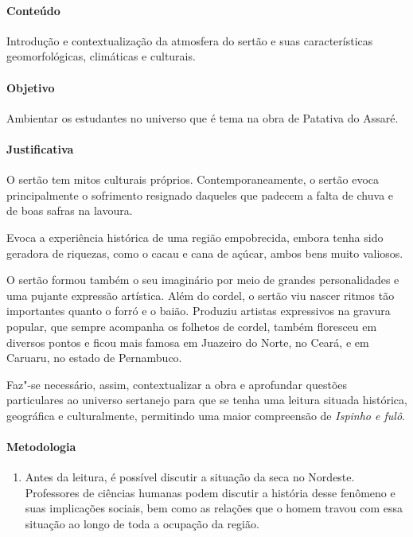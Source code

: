 \documentclass[12pt]{extarticle}
\begin{document}
{\paragraph{Conteúdo} Introdução e contextualização da atmosfera do sertão 
e suas características geomorfológicas, climáticas e culturais. 

\paragraph{Objetivo} Ambientar os estudantes no universo que é tema na 
obra de Patativa do Assaré.

\paragraph{Justificativa} O sertão tem mitos culturais próprios. 
Contemporaneamente, o sertão evoca principalmente o sofrimento resignado
daqueles que padecem a falta de chuva e de boas safras
na lavoura. 

Evoca a experiência histórica de uma região
empobrecida, embora tenha sido geradora de riquezas, como
o cacau e cana de açúcar, ambos bens muito valiosos.

O sertão formou também o seu imaginário por meio de
grandes personalidades e uma pujante expressão artística.
Além do cordel, o sertão viu nascer ritmos tão importantes
quanto o forró e o baião. Produziu artistas expressivos na 
gravura popular, que sempre acompanha os folhetos de cordel,
também floresceu em diversos pontos e ficou mais famosa
em Juazeiro do Norte, no Ceará, e em Caruaru, no estado
de Pernambuco.

Faz"-se necessário, assim, contextualizar a obra e aprofundar questões 
particulares ao universo sertanejo para que se tenha uma leitura situada histórica, geográfica e culturalmente, 
permitindo uma maior compreensão de \textit{Ispinho e fulô}. 

\paragraph{Metodologia}

\begin{enumerate}
\item
Antes da leitura, é possível discutir a situação da seca no
Nordeste. Professores de ciências humanas podem discutir a história
desse fenômeno e suas implicações sociais, bem como as relações que o
homem travou com essa situação ao longo de toda a ocupação da região.


\end{enumerate}}
\end{document}

